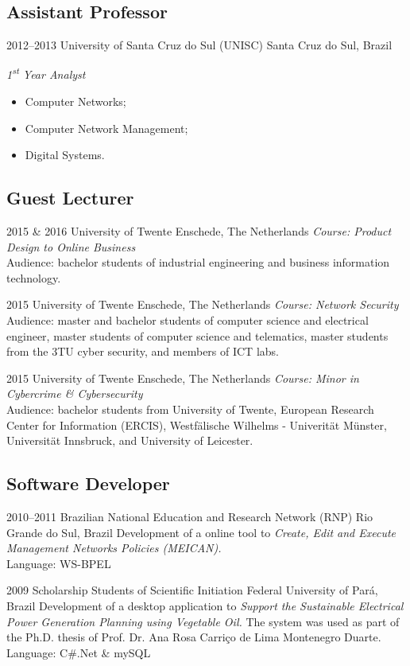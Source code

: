 \documentclass[]{friggeri-cv} %
\begin{document}
\subsection{Assistant Professor}
\begin{entrylist}
\entry
{2012--2013}
{University of Santa Cruz do Sul (UNISC)}
{Santa Cruz do Sul, Brazil}
{\emph{1\textsuperscript{st} Year Analyst}
\begin{itemize}
\item Computer Networks;
\item Computer Network Management;
\item Digital Systems.
\end{itemize}}
\end{entrylist}

\subsection{Guest Lecturer}
\begin{entrylist}
\entry
{2015 \& 2016}
{University of Twente}
{Enschede, The Netherlands}
{\emph{Course: Product Design to Online Business}\\ 
Audience: bachelor students of industrial engineering and business information technology. 
}

\entry
{2015}
{University of Twente}
{Enschede, The Netherlands}
{\emph{Course: Network Security}\\ 
Audience: master and bachelor students of computer science and electrical engineer, master students of computer science and telematics, master students from the 3TU cyber security, and members of ICT labs. 
}

\entry
{2015}
{University of Twente}
{Enschede, The Netherlands}
{\emph{Course: Minor in Cybercrime \& Cybersecurity}\\ 
Audience: bachelor students from University of Twente, European Research Center for Information (ERCIS), Westfälische Wilhelms - Univerität Münster, Universität Innsbruck, and University of Leicester.  
}
\end{entrylist}

\subsection{Software Developer}
\begin{entrylist}
\entry
{2010--2011}
{Brazilian National Education and Research Network (RNP)}
{Rio Grande do Sul, Brazil}
{Development of a online tool to \emph{Create, Edit and Execute Management Networks Policies (MEICAN).}\\
Language: WS-BPEL
}

\entry
{2009}
{Scholarship Students of Scientific Initiation}
{Federal University of Pará, Brazil}
{Development of a desktop application to \emph{Support the Sustainable Electrical Power Generation Planning using Vegetable Oil.} The system was used as part of the Ph.D. thesis of Prof. Dr. Ana Rosa Carriço de Lima Montenegro Duarte.\\
Language: C\#.Net \& mySQL
}
\end{entrylist}
\end{document}

